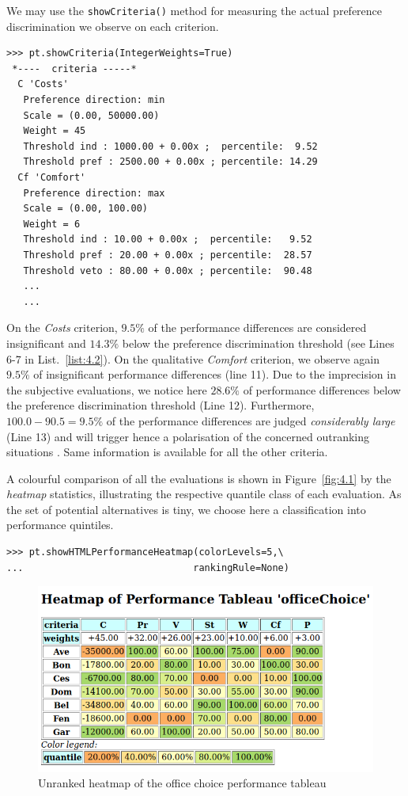 We may use the \texttt{showCriteria()} method for measuring the actual preference discrimination we observe on each criterion.
\begin{lstlisting}[caption={Inspecting the performance criteria.},label=list:4.2]
>>> pt.showCriteria(IntegerWeights=True)
 *----  criteria -----*
  C 'Costs'
   Preference direction: min
   Scale = (0.00, 50000.00)
   Weight = 45
   Threshold ind : 1000.00 + 0.00x ;  percentile:  9.52
   Threshold pref : 2500.00 + 0.00x ; percentile: 14.29
  Cf 'Comfort'
   Preference direction: max
   Scale = (0.00, 100.00)
   Weight = 6
   Threshold ind : 10.00 + 0.00x ;  percentile:   9.52
   Threshold pref : 20.00 + 0.00x ; percentile:  28.57
   Threshold veto : 80.00 + 0.00x ; percentile:  90.48
   ...
   ...
\end{lstlisting}

On the \emph{Costs} criterion, $9.5\%$ of the performance differences are considered insignificant and $14.3\%$ below the preference discrimination threshold (see Lines 6-7 in List.~\vref{list:4.2}). On the qualitative \emph{Comfort} criterion, we observe again $9.5\%$ of insignificant performance differences (line 11). Due to the imprecision in the subjective evaluations, we notice here $28.6\%$ of performance differences below the preference discrimination threshold (Line 12). Furthermore, $100.0 - 90.5 = 9.5\%$ of the performance differences are judged \emph{considerably large} (Line 13) and will trigger hence a polarisation of the concerned outranking situations \citep{BIS-2013}. Same information is available for all the other criteria. 
 
A colourful comparison of all the evaluations is shown in Figure~\vref{fig:4.1} by the \emph{heatmap} statistics, illustrating the respective quantile class of each evaluation. As the set of potential alternatives is tiny, we choose here a classification into performance quintiles.
\begin{lstlisting}
>>> pt.showHTMLPerformanceHeatmap(colorLevels=5,\
...                              rankingRule=None)
\end{lstlisting}
    \begin{figure}[ht]
\includegraphics[width=\hsize]{Figures/4-1-officeChoiceHeatmap.png}
\caption{Unranked heatmap of the office choice performance tableau}
\label{fig:4.1}       %
\end{figure}

